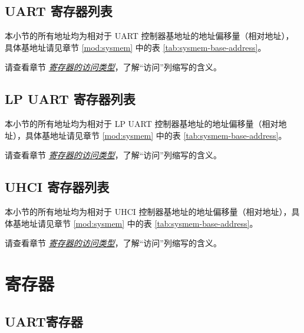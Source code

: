 \documentclass[main\_\_CN.tex]{subfiles}
\begin{document}
\subsection{UART 寄存器列表}

本小节的所有地址均为相对于 UART 控制器基地址的地址偏移量（相对地址），具体基地址请见章节 \ref{mod:sysmem} \textit{} 中的表 \ref{tab:sysmem-base-address}。

请查看章节 \hyperref[glossary-access-types]{\textit{寄存器的访问类型}}，了解“访问”列缩写的含义。




\subsection{LP UART 寄存器列表}

本小节的所有地址均为相对于 LP UART 控制器基地址的地址偏移量（相对地址），具体基地址请见章节 \ref{mod:sysmem} \textit{} 中的表 \ref{tab:sysmem-base-address}。

请查看章节 \hyperref[glossary-access-types]{\textit{寄存器的访问类型}}，了解“访问”列缩写的含义。




\subsection{UHCI 寄存器列表}

本小节的所有地址均为相对于 UHCI 控制器基地址的地址偏移量（相对地址），具体基地址请见章节 \ref{mod:sysmem} \textit{} 中的表 \ref{tab:sysmem-base-address}。

请查看章节 \hyperref[glossary-access-types]{\textit{寄存器的访问类型}}，了解“访问”列缩写的含义。





\clearpage
\section{寄存器}



\subsection{UART寄存器}
\end{document}
